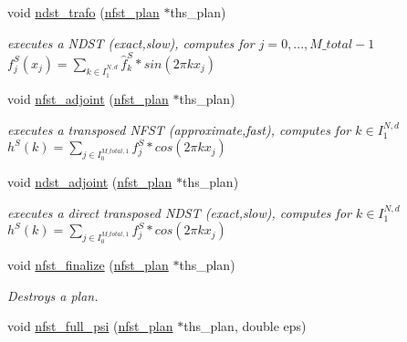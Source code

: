 \begin{CompactItemize}
void \hyperlink{group__nfsct_ga23}{ndst\_\-trafo} (\hyperlink{structnfst__plan}{nfst\_\-plan} $\ast$ths\_\-plan)
\begin{CompactList}\small\item\em executes a NDST (exact,slow), computes for $j=0,...,M\_total-1$ $f_j^S(x_j) = \sum_{k \in I_1^{N,d}} \hat{f}_k^S * sin(2 \pi k x_j)$ \item\end{CompactList}\item 
void \hyperlink{group__nfsct_ga24}{nfst\_\-adjoint} (\hyperlink{structnfst__plan}{nfst\_\-plan} $\ast$ths\_\-plan)
\begin{CompactList}\small\item\em executes a transposed NFST (approximate,fast), computes for $k \in I_1^{N,d}$ $h^S(k) = \sum_{j \in I_0^{M\_total,1}} f_j^S * cos(2 \pi k x_j)$ \item\end{CompactList}\item 
void \hyperlink{group__nfsct_ga25}{ndst\_\-adjoint} (\hyperlink{structnfst__plan}{nfst\_\-plan} $\ast$ths\_\-plan)
\begin{CompactList}\small\item\em executes a direct transposed NDST (exact,slow), computes for $k \in I_1^{N,d}$ $h^S(k) = \sum_{j \in I_0^{M\_total,1}} f_j^S * cos(2 \pi k x_j)$ \item\end{CompactList}\item 
void \hyperlink{group__nfsct_ga26}{nfst\_\-finalize} (\hyperlink{structnfst__plan}{nfst\_\-plan} $\ast$ths\_\-plan)
\begin{CompactList}\small\item\em Destroys a plan. \item\end{CompactList}\item 
\hypertarget{group__nfsct_ga27}{
void \hyperlink{group__nfsct_ga27}{nfst\_\-full\_\-psi} (\hyperlink{structnfst__plan}{nfst\_\-plan} $\ast$ths\_\-plan, double eps)}
\label{group__nfsct_ga27}


\end{CompactItemize}

